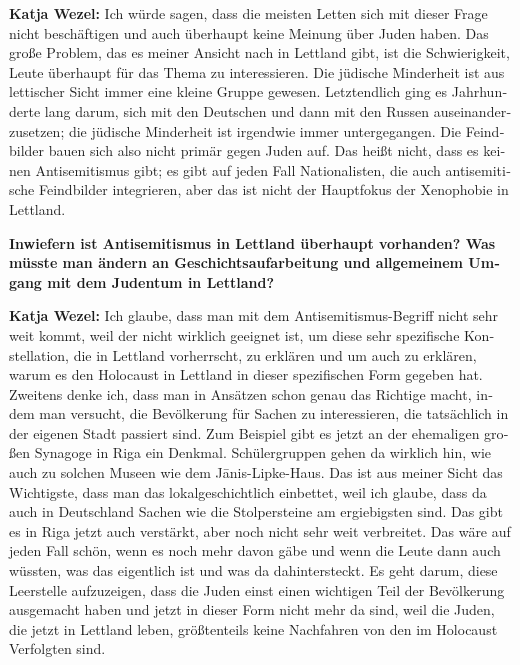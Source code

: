 \begin{otherlanguage}{ngerman}
\textbf{Katja Wezel:} Ich würde sagen, dass die meisten Letten sich mit dieser Frage nicht beschäftigen und auch überhaupt keine Meinung über Juden haben. Das große Problem, das es meiner Ansicht nach in Lettland gibt, ist die Schwierigkeit, Leute überhaupt für das Thema zu interessieren. Die jüdische Minderheit ist aus lettischer Sicht immer eine kleine Gruppe gewesen. Letztendlich ging es Jahrhunderte lang darum, sich mit den Deutschen und dann mit den Russen auseinanderzusetzen; die jüdische Minderheit ist irgendwie immer untergegangen. Die Feindbilder bauen sich also nicht primär gegen Juden auf. Das heißt nicht, dass es keinen Antisemitismus gibt; es gibt auf jeden Fall Nationalisten, die auch antisemitische Feindbilder integrieren, aber das ist nicht der Hauptfokus der Xenophobie in Lettland. 

\textbf{Inwiefern ist Antisemitismus in Lettland überhaupt vorhanden? Was müsste man ändern an Geschichtsaufarbeitung und allgemeinem Umgang mit dem Judentum in Lettland?} 

\textbf{Katja Wezel:} Ich glaube, dass man mit dem Antisemitismus-Begriff nicht sehr weit kommt, weil der nicht wirklich geeignet ist, um diese sehr spezifische Konstellation, die in Lettland vorherrscht, zu erklären und um auch zu erklären, warum es den Holocaust in Lettland in dieser spezifischen Form gegeben hat. Zweitens denke ich, dass man in Ansätzen schon genau das Richtige macht, indem man versucht, die Bevölkerung für Sachen zu interessieren, die tatsächlich in der eigenen Stadt passiert sind. Zum Beispiel gibt es jetzt an der ehemaligen großen Synagoge in Riga ein Denkmal. Schülergruppen gehen da wirklich hin, wie auch zu solchen Museen wie dem Jānis-Lipke-Haus. Das ist aus meiner Sicht das Wichtigste, dass man das lokalgeschichtlich einbettet, weil ich glaube, dass da auch in Deutschland Sachen wie die Stolpersteine am ergiebigsten sind. Das gibt es in Riga jetzt auch verstärkt, aber noch nicht sehr weit verbreitet. Das wäre auf jeden Fall schön, wenn es noch mehr davon gäbe und wenn die Leute dann auch wüssten, was das eigentlich ist und was da dahintersteckt. Es geht darum, diese Leerstelle aufzuzeigen, dass die Juden einst einen wichtigen Teil der Bevölkerung ausgemacht haben und jetzt in dieser Form nicht mehr da sind, weil die Juden, die jetzt in Lettland leben, größtenteils keine Nachfahren von den im Holocaust Verfolgten sind. 
\end{otherlanguage}
